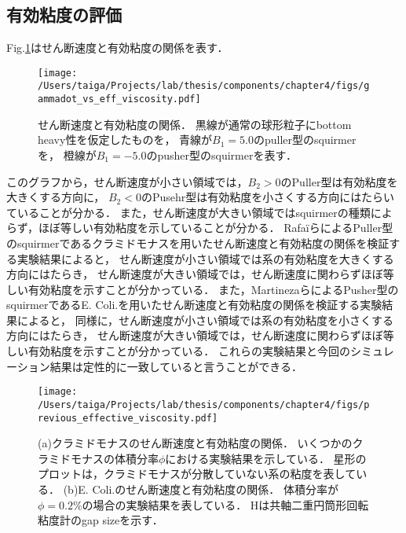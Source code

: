 \subsection{有効粘度の評価}
Fig.\ref{fig:estimate_eff_viscocity}はせん断速度と有効粘度の関係を表す．

    \begin{figure}[H]
        \centering
        \texttt{[image: /Users/taiga/Projects/lab/thesis/components/chapter4/figs/gammadot\_vs\_eff\_viscosity.pdf]}
        \caption{せん断速度と有効粘度の関係．
        黒線が通常の球形粒子にbottom heavy性を仮定したものを，
        青線が$B_1 = 5.0$のpuller型のsquirmerを，
        橙線が$B_1 = -5.0$のpusher型のsquirmerを表す．}
        \label{fig:estimate_eff_viscocity}
    \end{figure}

\noindent
このグラフから，せん断速度が小さい領域では，$B_2 > 0$のPuller型は有効粘度を大きくする方向に，
$B_2 < 0$のPusehr型は有効粘度を小さくする方向にはたらいていることが分かる．
また，せん断速度が大きい領域ではsquirmerの種類によらず，ほぼ等しい有効粘度を示していることが分かる．
Rafa\"iらによるPuller型のsquirmerであるクラミドモナスを用いたせん断速度と有効粘度の関係を検証する実験結果によると，
せん断速度が小さい領域では系の有効粘度を大きくする方向にはたらき，
せん断速度が大きい領域では，せん断速度に関わらずほぼ等しい有効粘度を示すことが分かっている\cite{effective_viscosity}．
また，MartinezaらによるPusher型のsquirmerであるE. Coli.を用いたせん断速度と有効粘度の関係を検証する実験結果によると，
同様に，せん断速度が小さい領域では系の有効粘度を小さくする方向にはたらき，
せん断速度が大きい領域では，せん断速度に関わらずほぼ等しい有効粘度を示すことが分かっている\cite{e_coli_experiment}．
これらの実験結果と今回のシミュレーション結果は定性的に一致していると言うことができる．

    \begin{figure}[htbp]
        \centering
        \texttt{[image: /Users/taiga/Projects/lab/thesis/components/chapter4/figs/previous\_effective\_viscosity.pdf]}
        \caption{(a)クラミドモナスのせん断速度と有効粘度の関係\cite{effective_viscosity}．
        いくつかのクラミドモナスの体積分率$\phi$における実験結果を示している．
        星形のプロットは，クラミドモナスが分散していない系の粘度を表している．
        (b)E. Coli.のせん断速度と有効粘度の関係\cite{e_coli_experiment}．
        体積分率が$\phi = 0.2 \%$の場合の実験結果を表している．
        Hは共軸二重円筒形回転粘度計のgap sizeを示す．}
    \end{figure}
